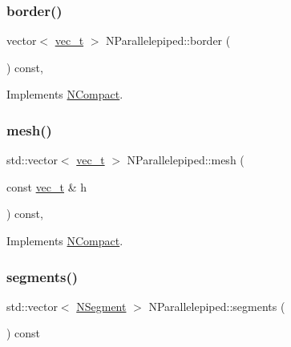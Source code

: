 \subsubsection{\texorpdfstring{border()}{border()}}
{\footnotesize\ttfamily vector$<$ \mbox{\hyperlink{_n_vector_8h_a0a2cfc67e738a3d73e4f12098c4c07f6}{vec\+\_\+t}} $>$ N\+Parallelepiped\+::border (\begin{DoxyParamCaption}{ }\end{DoxyParamCaption}) const\hspace{0.3cm}{\ttfamily [override]}, {\ttfamily [virtual]}}



Implements \mbox{\hyperlink{class_n_compact_af7acc50099e80fc13ce32c97e6857308}{N\+Compact}}.

\mbox{\label{class_n_parallelepiped_a0f9ba9f6cab5d2c9472776e69f9aa78d}} 
\subsubsection{\texorpdfstring{mesh()}{mesh()}}
{\footnotesize\ttfamily std\+::vector$<$ \mbox{\hyperlink{_n_vector_8h_a0a2cfc67e738a3d73e4f12098c4c07f6}{vec\+\_\+t}} $>$ N\+Parallelepiped\+::mesh (\begin{DoxyParamCaption}\item[{const \mbox{\hyperlink{_n_vector_8h_a0a2cfc67e738a3d73e4f12098c4c07f6}{vec\+\_\+t}} \&}]{h }\end{DoxyParamCaption}) const\hspace{0.3cm}{\ttfamily [override]}, {\ttfamily [virtual]}}



Implements \mbox{\hyperlink{class_n_compact_ad4cdc60c75ca433c63f44ec13063e2fe}{N\+Compact}}.

\mbox{\label{class_n_parallelepiped_a3440b48cfd7491ed747690a9f69dbbe4}} 
\subsubsection{\texorpdfstring{segments()}{segments()}}
{\footnotesize\ttfamily std\+::vector$<$ \mbox{\hyperlink{class_n_segment}{N\+Segment}} $>$ N\+Parallelepiped\+::segments (\begin{DoxyParamCaption}{ }\end{DoxyParamCaption}) const}

